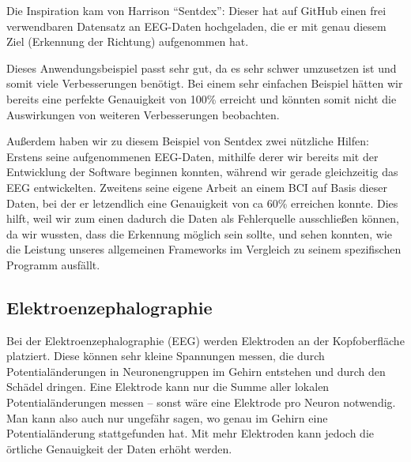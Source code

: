\documentclass[10pt]{article}
\begin{document}
Die Inspiration kam von Harrison \enquote{Sentdex}: Dieser hat auf GitHub einen frei verwendbaren Datensatz an EEG-Daten hochgeladen, die er mit genau diesem Ziel (Erkennung der Richtung) aufgenommen hat. \cite{Sentdex}

Dieses Anwendungsbeispiel passt sehr gut, da es sehr schwer umzusetzen ist und somit viele Verbesserungen benötigt.
Bei einem sehr einfachen Beispiel hätten wir bereits eine perfekte Genauigkeit von 100\% erreicht und könnten somit nicht die Auswirkungen von weiteren Verbesserungen beobachten.

Außerdem haben wir zu diesem Beispiel von Sentdex zwei nützliche Hilfen:
Erstens seine aufgenommenen EEG-Daten, mithilfe derer wir bereits mit der Entwicklung der Software beginnen konnten, während wir gerade gleichzeitig das EEG entwickelten.
Zweitens seine eigene Arbeit an einem BCI auf Basis dieser Daten, bei der er letzendlich eine Genauigkeit von ca 60\% erreichen konnte.
Dies hilft, weil wir zum einen dadurch die Daten als Fehlerquelle ausschließen können, da wir wussten, dass die Erkennung möglich sein sollte, und sehen konnten, wie die Leistung unseres allgemeinen Frameworks im Vergleich zu seinem spezifischen Programm ausfällt. 



\subsection{Elektroenzephalographie}

Bei der Elektroenzephalographie (EEG) werden Elektroden an der Kopfoberfläche platziert. 
Diese können sehr kleine Spannungen messen, die durch Potentialänderungen in Neuronengruppen im Gehirn entstehen und durch den Schädel dringen. 
Eine Elektrode kann nur die Summe aller lokalen Potentialänderungen messen -- sonst wäre eine Elektrode pro Neuron notwendig. 
Man kann also auch nur ungefähr sagen, wo genau im Gehirn eine Potentialänderung stattgefunden hat. 
Mit mehr Elektroden kann jedoch die örtliche Genauigkeit der Daten erhöht werden.
\end{document}
